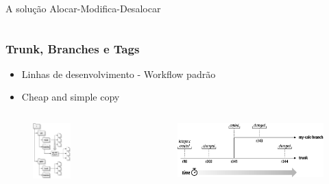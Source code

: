 \documentclass{beamer}
\begin{document}
\begin{frame}
\begin{columns}
\begin{column}{.5\textwidth}
\begin{block}{A solu\c{c}\~ao Alocar-Modifica-Desalocar}
\begin{figure}
                \end{figure}
            \end{block}
        \end{column}
    \end{columns}
\end{frame}

\begin{frame}
    \frametitle{Trunk, Branches e Tags}

    \begin{itemize}
        \item Linhas de desenvolvimento - Workflow padr\~ao
        \item Cheap and simple copy
    \end{itemize}
    \begin{columns}
        \begin{column}{.5\textwidth}
            \begin{figure}
                \includegraphics[width= 0.5\textwidth]{figures/copy}
            \end{figure}
        \end{column}
        \begin{column}{.5\textwidth}
            \begin{figure}
                \includegraphics[width = 1.1\textwidth]{figures/branche}

\end{figure}
\end{column}
\end{columns}
\end{frame}
\end{document}
